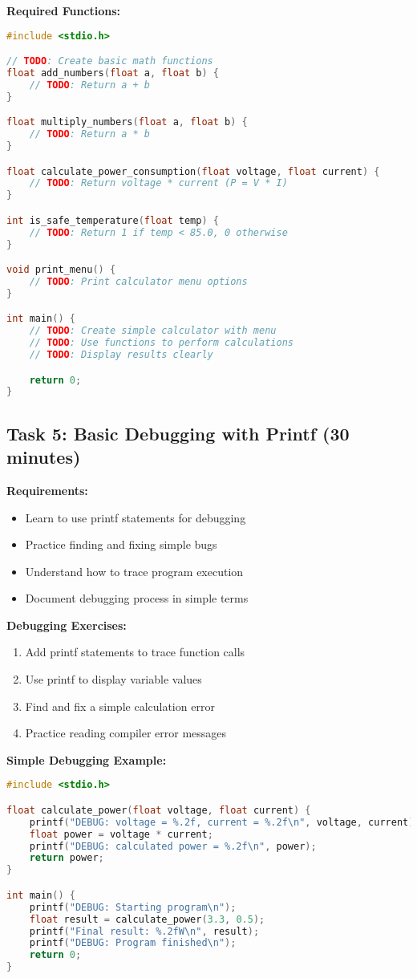 \documentclass[11pt,a4paper]{article}
\begin{document}
\textbf{Required Functions:}
\begin{lstlisting}[language=C]
#include <stdio.h>

// TODO: Create basic math functions
float add_numbers(float a, float b) {
    // TODO: Return a + b
}

float multiply_numbers(float a, float b) {
    // TODO: Return a * b
}

float calculate_power_consumption(float voltage, float current) {
    // TODO: Return voltage * current (P = V * I)
}

int is_safe_temperature(float temp) {
    // TODO: Return 1 if temp < 85.0, 0 otherwise
}

void print_menu() {
    // TODO: Print calculator menu options
}

int main() {
    // TODO: Create simple calculator with menu
    // TODO: Use functions to perform calculations
    // TODO: Display results clearly

    return 0;
}
\end{lstlisting}

\subsection{Task 5: Basic Debugging with Printf (30 minutes)}

\textbf{Requirements:}
\begin{itemize}
    \item Learn to use printf statements for debugging
    \item Practice finding and fixing simple bugs
    \item Understand how to trace program execution
    \item Document debugging process in simple terms
\end{itemize}

\textbf{Debugging Exercises:}
\begin{enumerate}
    \item Add printf statements to trace function calls
    \item Use printf to display variable values
    \item Find and fix a simple calculation error
    \item Practice reading compiler error messages
\end{enumerate}

\textbf{Simple Debugging Example:}
\begin{lstlisting}[language=C]
#include <stdio.h>

float calculate_power(float voltage, float current) {
    printf("DEBUG: voltage = %.2f, current = %.2f\n", voltage, current);
    float power = voltage * current;
    printf("DEBUG: calculated power = %.2f\n", power);
    return power;
}

int main() {
    printf("DEBUG: Starting program\n");
    float result = calculate_power(3.3, 0.5);
    printf("Final result: %.2fW\n", result);
    printf("DEBUG: Program finished\n");
    return 0;
}
\end{lstlisting}
\end{document}
